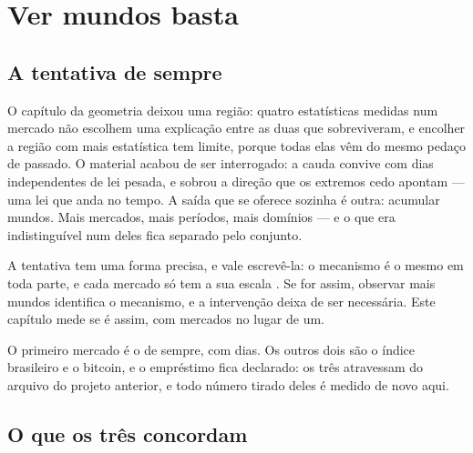 %
%

\chapter{Ver mundos basta}
\label{cap:observar}

\section{A tentativa de sempre}

O capítulo da geometria deixou uma região: quatro estatísticas medidas num mercado não escolhem
uma explicação entre as duas que sobreviveram, e encolher a região com mais estatística tem
limite, porque todas elas vêm do mesmo pedaço de passado. O material acabou de ser interrogado: a
cauda convive com dias independentes de lei pesada, e sobrou a direção que os extremos cedo
apontam --- uma lei que anda no tempo. A saída que se oferece sozinha é outra: acumular mundos. Mais mercados, mais períodos, mais domínios --- e o que era indistinguível num deles fica
separado pelo conjunto.

A tentativa tem uma forma precisa, e vale escrevê-la: o mecanismo é o mesmo em toda parte, e cada
mercado só tem a sua escala \cite{peters2016causal,scholkopf2021causal,ghassami2017learning}. Se for assim, observar mais mundos identifica o mecanismo, e a
intervenção deixa de ser necessária. Este capítulo mede se é assim, com \numObservarMercados{}
mercados no lugar de um.

O primeiro mercado é o de sempre, com \numObservarDiasMaior{} dias. Os outros dois são o índice
brasileiro e o bitcoin, e o empréstimo fica declarado: os três atravessam do arquivo do projeto
anterior, e todo número tirado deles é medido de novo aqui.

\section{O que os três concordam}


